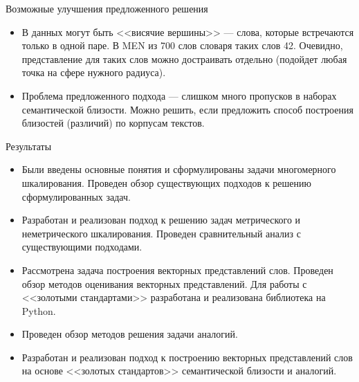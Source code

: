 \documentclass[9pt]{beamer}
\begin{document}
\begin{frame}{Возможные улучшения предложенного решения}

\begin{itemize}
    \item В данных могут быть <<висячие вершины>>  --- слова, которые встречаются только в одной паре. В MEN из 700 слов словаря таких слов 42. Очевидно, представление для таких слов можно достраивать отдельно (подойдет любая точка на сфере нужного радиуса).
    
    \item Проблема предложенного подхода --- слишком много пропусков в наборах семантической близости. Можно решить, если предложить способ построения близостей (различий) по корпусам текстов.

    \end{itemize}
    
\end{frame}

\begin{frame}{Результаты}

\begin{itemize}
    \item Были введены основные понятия и сформулированы задачи многомерного шкалирования. Проведен обзор существующих подходов к решению сформулированных задач.
    \item Разработан и реализован подход к решению задач метрического и неметрического шкалирования. Проведен сравнительный анализ с существующими подходами.
    \item Рассмотрена задача построения векторных представлений слов. Проведен обзор методов оценивания векторных представлений. Для работы с <<золотыми стандартами>> разработана и реализована библиотека на Python.
    \item Проведен обзор методов решения задачи аналогий. 
    \item Разработан и реализован подход к построению векторных представлений слов на основе <<золотых стандартов>> семантической близости и аналогий.
\end{itemize}
    
\end{frame}
\end{document}
